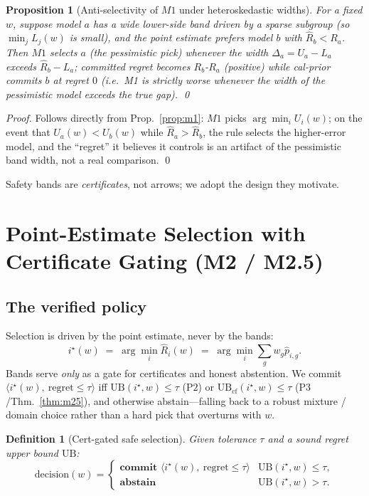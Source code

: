 \documentclass{article}
\newtheorem{proposition}{Proposition}
\newtheorem{definition}{Definition}
\begin{document}
\begin{proposition}[Anti-selectivity of $M1$ under heteroskedastic widths]
\label{prop:m1anti}
For a fixed $w$, suppose model $a$ has a wide lower-side band driven by a sparse subgroup
(so $\min_j L_j(w)$ is small), and the point estimate prefers model $b$ with $\hat R_b<R_a$.
Then $M1$ selects $a$ (the pessimistic pick) whenever the width
$\Delta_a=U_a-L_a$ exceeds $\hat R_b-L_a$; committed regret becomes
$R_b$-$R_a$ (positive) while cal-prior commits $b$ at regret $0$ (i.e.~M1 is strictly
worse whenever the width of the pessimistic model exceeds the true gap). \qed
\end{proposition}
\begin{proof}
Follows directly from Prop.~\ref{prop:m1}: $M1$ picks $\arg\min_i U_i(w)$; on the event that
$U_a(w)<U_b(w)$ while $\hat R_a>\hat R_b$, the rule selects the higher-error model, and the
``regret'' it believes it controls is an artifact of the pessimistic band width, not a real
comparison. \qed
\end{proof}

Safety bands are \emph{certificates}, not arrows; we adopt the design they motivate.

\section{Point-Estimate Selection with Certificate Gating (M2 / M2.5)}
\label{sec:m2}

\subsection{The verified policy}
Selection is driven by the point estimate, never by the bands:
\[
  i^\star(w)\;=\;\arg\min_i \hat R_i(w)\;=\;\arg\min_i \textstyle\sum_g w_g \hat p_{i,g}.
\]
Bands serve \emph{only} as a gate for certificates and honest abstention. We commit
$\langle i^\star(w),\ \mathrm{regret}\le\tau\rangle$ iff $\mathrm{UB}(i^\star,w)\le\tau$
($\mathrm{P2}$) or $\mathrm{UB}_{\mathrm{cf}}(i^\star,w)\le\tau$ ($\mathrm{P3}$/Thm.~\ref{thm:m25}),
and otherwise abstain---falling back to a robust mixture / domain choice rather than a hard
pick that overturns with $w$.

\begin{definition}[Cert-gated safe selection]
\label{def:gated}
Given tolerance $\tau$ and a sound regret upper bound $\mathrm{UB}$:
\[
  \mathrm{decision}(w)=\begin{cases}
    \textbf{commit }\langle i^\star(w),\ \mathrm{regret}\le\tau\rangle &
      \mathrm{UB}(i^\star,w)\le\tau,\\
    \textbf{abstain} & \mathrm{UB}(i^\star,w)>\tau.
  \end{cases}
\]
\end{definition}
\end{document}

